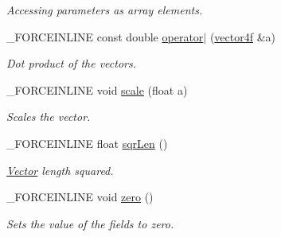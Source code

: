 \begin{DoxyCompactItemize}
\begin{DoxyCompactList}\small\item\em Accessing parameters as array elements. \end{DoxyCompactList}\item 
\hypertarget{classbt_1_1vector4f_a2bd4a7592b87d5788807dcc71780aad3}{\-\_\-\-F\-O\-R\-C\-E\-I\-N\-L\-I\-N\-E const double \hyperlink{classbt_1_1vector4f_a2bd4a7592b87d5788807dcc71780aad3}{operator$|$} (\hyperlink{classbt_1_1vector4f}{vector4f} \&a)}\label{classbt_1_1vector4f_a2bd4a7592b87d5788807dcc71780aad3}

\begin{DoxyCompactList}\small\item\em Dot product of the vectors. \end{DoxyCompactList}\item 
\hypertarget{classbt_1_1vector4f_a3546e25ceaf5f7c1e9438cf6dc9ef2f0}{\-\_\-\-F\-O\-R\-C\-E\-I\-N\-L\-I\-N\-E void \hyperlink{classbt_1_1vector4f_a3546e25ceaf5f7c1e9438cf6dc9ef2f0}{scale} (float a)}\label{classbt_1_1vector4f_a3546e25ceaf5f7c1e9438cf6dc9ef2f0}

\begin{DoxyCompactList}\small\item\em Scales the vector. \end{DoxyCompactList}\item 
\hypertarget{classbt_1_1vector4f_a0824dab76e23f145c19881b5a4823c45}{\-\_\-\-F\-O\-R\-C\-E\-I\-N\-L\-I\-N\-E float \hyperlink{classbt_1_1vector4f_a0824dab76e23f145c19881b5a4823c45}{sqr\-Len} ()}\label{classbt_1_1vector4f_a0824dab76e23f145c19881b5a4823c45}

\begin{DoxyCompactList}\small\item\em \hyperlink{classbt_1_1_vector}{Vector} length squared. \end{DoxyCompactList}\item 
\hypertarget{classbt_1_1vector4f_a329fe59e209dfbb0f7fcf4669cfc80a4}{\-\_\-\-F\-O\-R\-C\-E\-I\-N\-L\-I\-N\-E void \hyperlink{classbt_1_1vector4f_a329fe59e209dfbb0f7fcf4669cfc80a4}{zero} ()}\label{classbt_1_1vector4f_a329fe59e209dfbb0f7fcf4669cfc80a4}

\begin{DoxyCompactList}\small\item\em Sets the value of the fields to zero. \end{DoxyCompactList}\end{DoxyCompactItemize}
